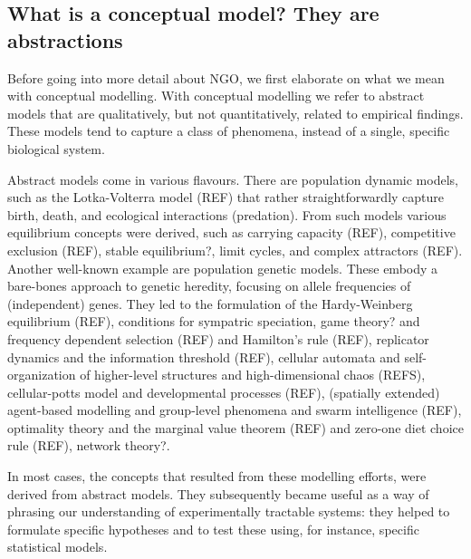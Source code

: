 \subsection{What is a conceptual model? They are abstractions}

Before going into more detail about NGO, we first elaborate on what we mean with conceptual modelling. With conceptual modelling we refer to abstract models that are qualitatively, but not quantitatively, related to empirical findings. These models tend to capture a class of phenomena, instead of a single, specific biological system.

Abstract models come in various flavours. There are population dynamic models, such as the Lotka-Volterra model (REF) that rather straightforwardly capture birth, death, and ecological interactions (predation). From such models various equilibrium concepts were derived, such as carrying capacity (REF), competitive exclusion (REF), stable equilibrium?, limit cycles, and complex attractors (REF). Another well-known example are population genetic models. These embody a bare-bones approach to genetic heredity, focusing on allele frequencies of (independent) genes. They led to the formulation of the Hardy-Weinberg equilibrium (REF), conditions for sympatric speciation, game theory? and frequency dependent selection (REF) and Hamilton’s rule (REF), replicator dynamics and the information threshold (REF), cellular automata and self-organization of higher-level structures and high-dimensional chaos (REFS), cellular-potts model and developmental processes (REF), (spatially extended) agent-based modelling and group-level phenomena and swarm intelligence (REF), optimality theory and the marginal value theorem (REF) and zero-one diet choice rule (REF), network theory?.

In most cases, the concepts that resulted from these modelling efforts, were derived from abstract models. They subsequently became useful as a way of phrasing our understanding of experimentally tractable systems: they helped to formulate specific hypotheses and to test these using, for instance, specific statistical models.
  